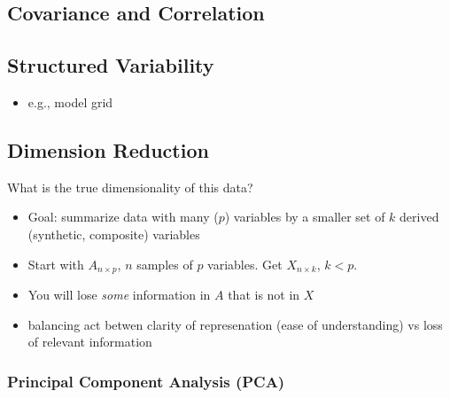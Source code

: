 \documentclass[
  letterpaper,
  DIV=11,
  numbers=noendperiod]{scrreprt}
\providecommand{\tightlist}{%
  \setlength{\itemsep}{0pt}\setlength{\parskip}{0pt}}
\begin{document}
\subsection{Covariance and
Correlation}\label{covariance-and-correlation}

\subsection{Structured Variability}\label{structured-variability}

\begin{itemize}
\tightlist
\item
  e.g., model grid
\end{itemize}

\subsection{Dimension Reduction}\label{dimension-reduction}

\begin{tcolorbox}[enhanced jigsaw, arc=.35mm, breakable, title=\textcolor{quarto-callout-note-color}{\faInfo}\hspace{0.5em}{Motivate with some example scatterplots}, coltitle=black, opacityback=0, bottomtitle=1mm, colback=white, left=2mm, opacitybacktitle=0.6, toptitle=1mm, colframe=quarto-callout-note-color-frame, leftrule=.75mm, titlerule=0mm, rightrule=.15mm, bottomrule=.15mm, colbacktitle=quarto-callout-note-color!10!white, toprule=.15mm]

What is the true dimensionality of this data?

\end{tcolorbox}

\begin{itemize}
\tightlist
\item
  Goal: summarize data with many (\(p\)) variables by a smaller set of
  \(k\) derived (synthetic, composite) variables
\item
  Start with \(A_{n \times p}\), \(n\) samples of \(p\) variables. Get
  \(X_{n \times k}\), \(k < p\).
\item
  You will lose \emph{some} information in \(A\) that is not in \(X\)
\item
  balancing act betwen clarity of represenation (ease of understanding)
  vs loss of relevant information
\end{itemize}

\subsubsection{Principal Component Analysis
(PCA)}\label{principal-component-analysis-pca-1}
\end{document}
